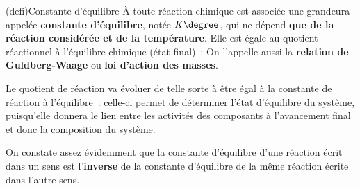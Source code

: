 \documentclass[../../main/main.tex]{subfiles}
\begin{document}
\begin{tcb}[label=def:K](defi){Constante d'équilibre}
	À toute réaction chimique est associée une grandeura appelée \textbf{constante
		d'équilibre}, notée $K\degree$, qui ne dépend \textbf{que de la réaction
		considérée et de la température}. Elle est égale au quotient réactionnel à
	l'équilibre chimique (état final)~:
	\psw{
		\[
			\boxed{K \degree = Q_{r, \eq}}
		\]
	}
	On l'appelle aussi la \textbf{relation de Guldberg-Waage} ou \textbf{loi
		d'action des masses}.
\end{tcb}

Le quotient de réaction va évoluer de telle sorte à être égal à la constante de
réaction à l'équilibre~: celle-ci permet de déterminer l'état d'équilibre du
système, puisqu'elle donnera le lien entre les activités des composants à
l'avancement final et donc la composition du système.

On constate assez évidemment que la constante d'équilibre d'une réaction écrit
dans un sens est l'\textbf{inverse} de la constante d'équilibre de la même
réaction écrite dans l'autre sens.
\end{document}
